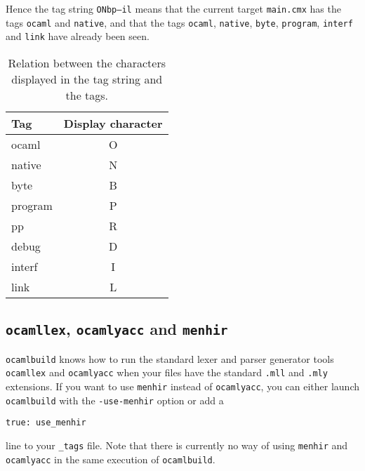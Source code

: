 \documentclass[9pt]{article}
\newcommand{\ocb}{\texttt{ocamlbuild}\xspace}
\begin{document}
Hence the tag string \texttt{ONbp--il} means that the current target
\texttt{main.cmx} has the tags \texttt{ocaml} and \texttt{native}, and that
the tags \texttt{ocaml}, \texttt{native}, \texttt{byte}, \texttt{program},
\texttt{interf} and \texttt{link} have already been seen.

\begin{table}
  \begin{center}
    \begin{tabular}{|l|c|}
       \hline
       \textbf{Tag} & \textbf{Display character} \\
       \hline
       \hline
       ocaml	& O \\
       \hline
       native	& N \\
       \hline
       byte	& B \\
       \hline
       program	& P \\
       \hline
       pp	        & R \\
       \hline
       debug	& D \\
       \hline
       interf	& I \\
       \hline
       link	& L \\
       \hline
    \end{tabular}
  \end{center}
  \caption{\label{tab:tag-chars} Relation between the characters displayed in
    the tag string and the tags.}
\end{table}
\subsection{\texttt{ocamllex}, \texttt{ocamlyacc} and \texttt{menhir}}
\ocb knows how to run the standard lexer and parser generator tools
\texttt{ocamllex} and \texttt{ocamlyacc} when your files have the
standard \texttt{.mll} and \texttt{.mly} extensions.  If you want to
use \texttt{menhir} instead of \texttt{ocamlyacc}, you can either
launch \ocb with the \texttt{-use-menhir} option or add a
\begin{verbatim}
true: use_menhir
\end{verbatim}
line to your \texttt{\_tags} file.  Note that there is currently no way
of using \texttt{menhir} and \texttt{ocamlyacc} in the same execution
of \ocb.
\end{document}
